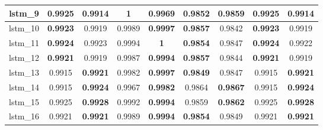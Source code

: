 \begin{table}[p]
\begin{tabular} {|c|c|c|c|c|c|c|c|c| }
        lstm\_9  & \textbf{0.9925}               & 0.9914                              & \textbf{\cellcolor{green!50}1} & 0.9969                         & 0.9852                     & \textbf{0.9859}                     & \textbf{0.9925}            & 0.9914                              \\ \hline
        lstm\_10 & \textbf{0.9923}               & 0.9919                              & 0.9989                         & \textbf{0.9997}                & \textbf{0.9857}            & 0.9842                              & \textbf{0.9923}            & 0.9919                              \\ \hline
        lstm\_11 & \textbf{0.9924}               & 0.9923                              & 0.9994                         & \textbf{\cellcolor{green!50}1} & \textbf{0.9854}            & 0.9847                              & \textbf{0.9924}            & 0.9922                              \\ \hline
        lstm\_12 & \textbf{0.9921}               & 0.9919                              & 0.9987                         & \textbf{0.9994}                & \textbf{0.9857}            & 0.9844                              & \textbf{0.9921}            & 0.9919                              \\ \hline
        lstm\_13 & 0.9915                        & \textbf{0.9921}                     & 0.9982                         & \textbf{0.9997}                & \textbf{0.9849}            & 0.9847                              & 0.9915                     & \textbf{0.9921}                     \\ \hline
        lstm\_14 & 0.9915                        & \textbf{0.9924}                     & 0.9967                         & \textbf{0.9982}                & \cellcolor{green!50}0.9864 & \textbf{\cellcolor{green!50}0.9867} & 0.9915                     & \textbf{0.9924}                     \\ \hline
        lstm\_15 & 0.9925                        & \textbf{0.9928}                     & 0.9992                         & \textbf{0.9994}                & 0.9859                     & \textbf{0.9862}                     & 0.9925                     & \textbf{0.9928}                     \\ \hline
        lstm\_16 & 0.9921                        & \textbf{0.9921}                     & 0.9989                         & \textbf{0.9994}                & \textbf{0.9854}            & 0.9849                              & 0.9921                     & \textbf{0.9921}                     \\ \hline

\end{tabular}
\end{table}
